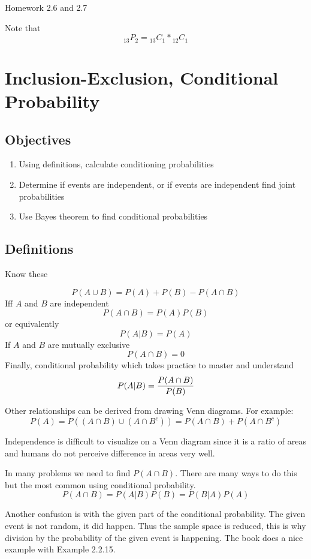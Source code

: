 \documentclass[]{book}
\providecommand{\tightlist}{%
  \setlength{\itemsep}{0pt}\setlength{\parskip}{0pt}}
\theoremstyle{definition}
\theoremstyle{definition}
\theoremstyle{definition}
\theoremstyle{remark}
\begin{document}
Homework 2.6 and 2.7

Note that \[{_{13}P_{2}}= {_{13}C_{1}} * {_{12}C_{1}}\]

\hypertarget{L6}{\section{Inclusion-Exclusion, Conditional
Probability}\label{L6}}

\subsection{Objectives}\label{objectives-5}

\begin{enumerate}
\def\labelenumi{\arabic{enumi}.}
\tightlist
\item
  Using definitions, calculate conditioning probabilities\\
\item
  Determine if events are independent, or if events are independent find
  joint probabilities\\
\item
  Use Bayes theorem to find conditional probabilities
\end{enumerate}

\subsection{Definitions}\label{definitions}

Know these

\[P(A \cup B)=P(A)+P(B)-P(A \cap B)\] Iff \(A\) and \(B\) are
independent \[P(A \cap B)=P(A)P(B)\] or equivalently \[P(A|B)=P(A)\] If
\(A\) and \(B\) are mutually exclusive \[P(A \cap B)=0\] Finally,
conditional probability which takes practice to master and understand
\[P(A|B)={P(A \cap B) \over P(B)}\]

Other relationships can be derived from drawing Venn diagrams. For
example:
\[P(A)=P((A \cap B) \cup (A \cap B^c))=P(A\cap B) + P(A \cap B^c)\]

Independence is difficult to visualize on a Venn diagram since it is a
ratio of areas and humans do not perceive difference in areas very well.

In many problems we need to find \(P(A \cap B)\). There are many ways to
do this but the most common using conditional probability.
\[P(A \cap B)=P(A|B)P(B)=P(B|A)P(A)\]

Another confusion is with the given part of the conditional probability.
The given event is not random, it did happen. Thus the sample space is
reduced, this is why division by the probability of the given event is
happening. The book does a nice example with Example 2.2.15.
\end{document}

